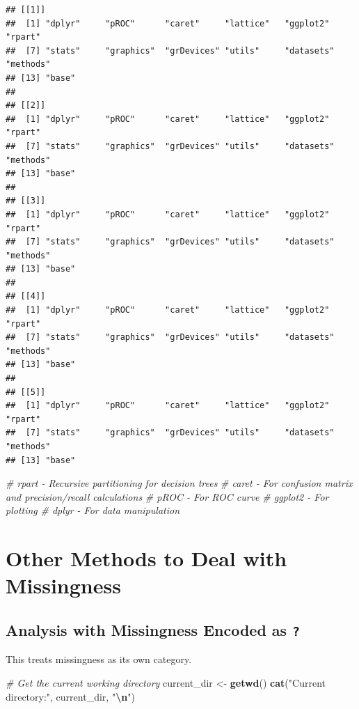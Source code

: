\documentclass[
]{article}
\newenvironment{Shaded}{\begin{snugshade}}{\end{snugshade}}
\newcommand{\CommentTok}[1]{\textcolor[rgb]{0.56,0.35,0.01}{\textit{#1}}}
\newcommand{\FunctionTok}[1]{\textcolor[rgb]{0.13,0.29,0.53}{\textbf{#1}}}
\newcommand{\NormalTok}[1]{#1}
\newcommand{\OtherTok}[1]{\textcolor[rgb]{0.56,0.35,0.01}{#1}}
\newcommand{\SpecialCharTok}[1]{\textcolor[rgb]{0.81,0.36,0.00}{\textbf{#1}}}
\newcommand{\StringTok}[1]{\textcolor[rgb]{0.31,0.60,0.02}{#1}}
\begin{document}
\begin{verbatim}
## [[1]]
##  [1] "dplyr"     "pROC"      "caret"     "lattice"   "ggplot2"   "rpart"    
##  [7] "stats"     "graphics"  "grDevices" "utils"     "datasets"  "methods"  
## [13] "base"     
## 
## [[2]]
##  [1] "dplyr"     "pROC"      "caret"     "lattice"   "ggplot2"   "rpart"    
##  [7] "stats"     "graphics"  "grDevices" "utils"     "datasets"  "methods"  
## [13] "base"     
## 
## [[3]]
##  [1] "dplyr"     "pROC"      "caret"     "lattice"   "ggplot2"   "rpart"    
##  [7] "stats"     "graphics"  "grDevices" "utils"     "datasets"  "methods"  
## [13] "base"     
## 
## [[4]]
##  [1] "dplyr"     "pROC"      "caret"     "lattice"   "ggplot2"   "rpart"    
##  [7] "stats"     "graphics"  "grDevices" "utils"     "datasets"  "methods"  
## [13] "base"     
## 
## [[5]]
##  [1] "dplyr"     "pROC"      "caret"     "lattice"   "ggplot2"   "rpart"    
##  [7] "stats"     "graphics"  "grDevices" "utils"     "datasets"  "methods"  
## [13] "base"
\end{verbatim}

\begin{Shaded}
\begin{Highlighting}[]
\CommentTok{\# rpart      {-} Recursive partitioning for decision trees}
\CommentTok{\# caret      {-} For confusion matrix and precision/recall calculations}
\CommentTok{\# pROC       {-} For ROC curve}
\CommentTok{\# ggplot2    {-} For plotting}
\CommentTok{\# dplyr      {-} For data manipulation}
\end{Highlighting}
\end{Shaded}

\section{Other Methods to Deal with Missingness}\label{other-methods-to-deal-with-missingness}

\subsection{\texorpdfstring{Analysis with Missingness Encoded as \texttt{?}}{Analysis with Missingness Encoded as ?}}\label{analysis-with-missingness-encoded-as}

This treats missingness as its own category.

\begin{Shaded}
\begin{Highlighting}[]
\CommentTok{\# Get the current working directory}
\NormalTok{current\_dir }\OtherTok{\textless{}{-}} \FunctionTok{getwd}\NormalTok{()}
\FunctionTok{cat}\NormalTok{(}\StringTok{"Current directory:"}\NormalTok{, current\_dir, }\StringTok{"}\SpecialCharTok{\textbackslash{}n}\StringTok{"}\NormalTok{)}
\end{Highlighting}
\end{Shaded}
\end{document}
